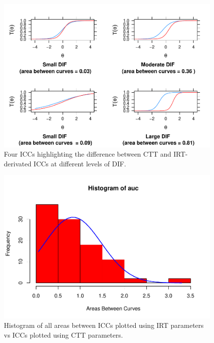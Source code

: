 \documentclass[
  man]{apa6}
\begin{document}
\begin{figure}
\centering
\includegraphics{ICC_project_files/figure-latex/plotting-1.pdf}
\caption{\label{fig:plotting}Four ICCs highlighting the difference between CTT and IRT-derivated ICCs at different levels of DIF.}
\end{figure}

\begin{figure}
\centering
\includegraphics{ICC_project_files/figure-latex/histrogram-1.pdf}
\caption{\label{fig:histrogram}Histogram of all areas between ICCs plotted using IRT parameters vs ICCs plotted using CTT parameters.}
\end{figure}
\end{document}
